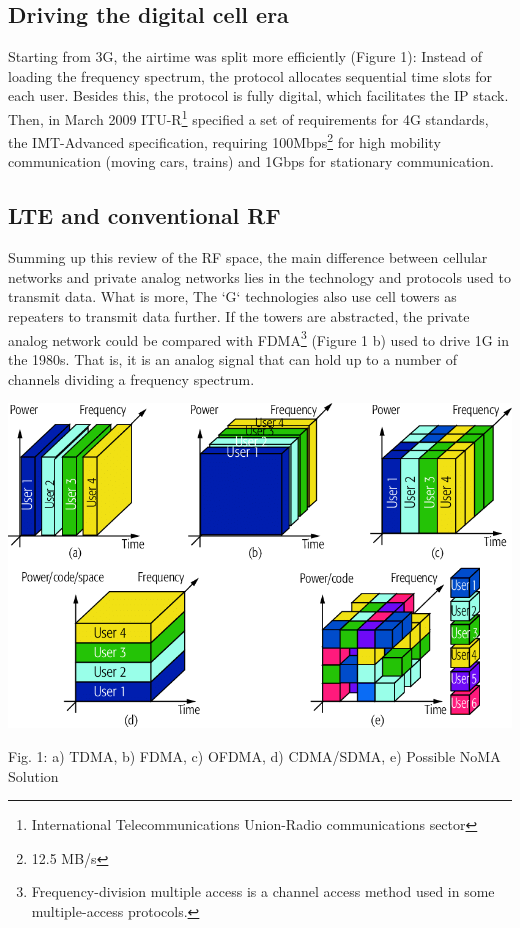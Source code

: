 \documentclass{IEEEtran}
\begin{document}
\subsection*{Driving the digital cell era}
Starting from 3G, the airtime was split more efficiently (Figure 1): Instead of loading the frequency spectrum, the protocol allocates sequential time slots for each user. Besides this, the protocol is fully digital, which facilitates the IP stack. Then, in March 2009 ITU-R\footnote{International Telecommunications Union-Radio communications sector} specified a set of requirements for 4G standards, the IMT-Advanced specification, requiring 100Mbps\footnote{12.5 MB/s} for high mobility communication (moving cars, trains) and 1Gbps for stationary communication.
\subsection*{LTE and conventional RF}
Summing up this review of the RF space, the main difference between cellular networks and private analog networks lies in the technology and protocols used to transmit data. What is more, The `G` technologies also use cell towers as repeaters to transmit data further. If the towers are abstracted, the private analog network could be compared with FDMA\footnote{Frequency-division multiple access is a channel access method used in some multiple-access protocols.} (Figure 1 b) used to drive 1G in the 1980s. That is, it is an analog signal that can hold up to a number of channels dividing a frequency spectrum.
\begin{center}\includegraphics[scale=.3]{FDMA.png}\end{center}
\begin{it}\begin{center}Fig. 1: a) TDMA, b) FDMA, c) OFDMA, d) CDMA/SDMA, e) Possible NoMA Solution \citep{chen_2018_toward} \end{center}\end{it}
\end{document}

